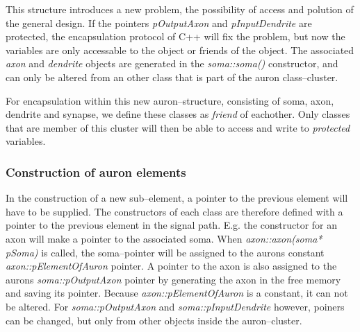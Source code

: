	This structure introduces a new problem, the possibility of access and polution of the general design. 
	If the pointers \emph{pOutputAxon} and \emph{pInputDendrite} are protected, the encapsulation protocol of C++ will fix the problem, but now the variables are only accessable to the object or friends of the object.
	The associated \emph{axon} and \emph{dendrite} objects are generated in the \emph{soma::soma()} constructor, and can only be altered from an other class that is part of the auron class--cluster. %

	For encapsulation within this new auron--structure, consisting of soma, axon, dendrite and synapse, we define these classes as \emph{friend} of eachother. 
	Only classes that are member of this cluster will then be able to access and write to \emph{protected} variables.



	


	\subsubsection{Construction of auron elements} %
	In the construction of a new sub--element, a pointer to the previous element will have to be supplied. 
	The constructors of each class are therefore defined with a pointer to the previous element in the signal path. E.g. the constructor for an axon will make a pointer to the associated soma. 
	When \emph{axon::axon(soma* pSoma)} is called, the soma--pointer will be assigned to the aurons constant \emph{axon::pElementOfAuron} pointer.
	A pointer to the axon is also assigned to the aurons \emph{soma::pOutputAxon} pointer by generating the axon in the free memory and saving its pointer.
	Because \emph{axon::pElementOfAuron} is a constant, it can not be altered. For \emph{soma::pOutputAxon} and \emph{soma::pInputDendrite} however, poiners can be changed, but only from other objects inside the auron--cluster.

